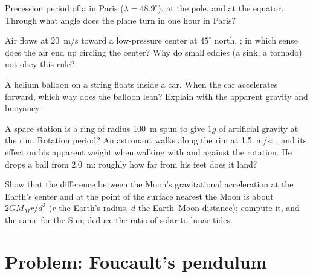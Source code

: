 \begin{exercise}[$\star\star$]\label{exo:b1:non-inertial-frames:8}
Precession period of a  in Paris ($\lambda = 48.9^\circ$),
at the pole, and at the equator. Through what angle does the plane turn
in one hour in Paris?
\end{exercise}

\begin{exercise}[$\star\star$]\label{exo:b1:non-inertial-frames:9}
Air flows at \qty{20}{m/s} toward a low-pressure center at $45^\circ$
north. ; in which sense does the air end up
circling the center? Why do small eddies (a sink, a tornado) not obey
this rule?
\end{exercise}

\begin{exercise}[$\star\star\star$]\label{exo:b1:non-inertial-frames:10}
A helium balloon on a string floats inside a car. When the car
accelerates forward, which way does the balloon lean? Explain with the
apparent gravity and buoyancy.
\end{exercise}

\begin{exercise}[$\star\star\star$]\label{exo:b1:non-inertial-frames:11}
A space station is a ring of radius \qty{100}{m} spun to give $1g$ of
artificial gravity at the rim. Rotation period? An astronaut walks along
the rim at \qty{1.5}{m/s}: , and its effect on his
apparent weight when walking with and against the rotation. He drops a
ball from \qty{2.0}{m}: roughly how far from his feet does it land?
\end{exercise}

\begin{exercise}[$\star\star\star$]\label{exo:b1:non-inertial-frames:12}
Show that the difference between the Moon's gravitational acceleration
at the Earth's center and at the point of the surface nearest the Moon is
about $2GM_Mr/d^3$ ($r$ the Earth's radius, $d$ the Earth--Moon distance);
compute it, and the same for the Sun; deduce the ratio of solar to lunar
tides.
\end{exercise}

\section{Problem: Foucault's pendulum}

